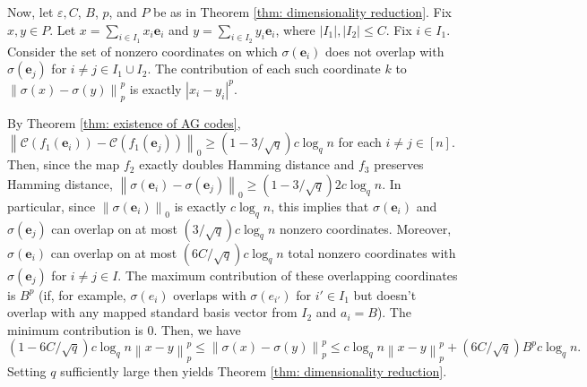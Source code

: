 \documentclass{theoretics}
\newcommand{\1}{\textbf{1}}
\newcommand{\norm}[1]{\left\lVert#1\right\rVert}
\newcommand{\e}{\mathbf{e}}
\begin{document}
Now, let $\varepsilon, C$, $B$, $p$, and $P$ be as in Theorem \ref{thm: dimensionality reduction}. Fix $x, y \in P$. Let $x = \sum_{i \in I_1} x_i \e_i$ and  $y = \sum_{i \in I_2} y_i \e_i$, where $|I_1|, |I_2| \leq C$. Fix $i \in I_1$. Consider the set of nonzero coordinates on which $\sigma(\e_i)$ does not overlap with $\sigma(\e_j)$ for $i \neq j \in I_1 \cup I_2$. The contribution of each such coordinate $k$ to $\norm{\sigma(x) - \sigma(y)}_p^p$ is exactly $|x_i - y_i|^p$. 

By Theorem \ref{thm: existence of AG codes}, $\norm{\mathcal{C}(f_1(\e_i)) - \mathcal{C}(f_1(\e_j))}_0 \geq (1 - 3/\sqrt{q}) c \log_q n$ for each $i \neq j \in [n]$. Then, since the map $f_2$ exactly doubles Hamming distance and $f_3$ preserves Hamming distance, $\norm{\sigma(\e_i) - \sigma(\e_j)}_0 \geq (1 - 3/\sqrt{q}) 2c \log_q n$. In particular, since $\norm{\sigma(\e_i)}_0$ is exactly $c \log_q n$, this implies that $\sigma(\e_i)$ and $\sigma(\e_j)$ can overlap on at most $(3/\sqrt{q}) c\log_q n$ nonzero coordinates. Moreover, $\sigma(\e_i)$ can overlap on at most $(6C/\sqrt{q}) c\log_q n$ total nonzero coordinates with $\sigma(\e_j)$ for $i \neq j \in I$. The maximum contribution of these overlapping coordinates is $B^p$ (if, for example, $\sigma(e_i)$ overlaps with $\sigma(e_{i'})$ for $i' \in I_1$ but doesn't overlap with any mapped standard basis vector from $I_2$ and $a_i = B$). The minimum contribution is $0$. Then, we have 
\[
(1 - 6C/\sqrt{q}) c\log_q n \norm{ x - y}_p^p \leq \norm{\sigma(x) - \sigma(y)}_p^p \leq c\log_q n \norm{ x - y}_p^p + (6C/\sqrt{q})B^p c \log_q n.
\]
Setting $q$ sufficiently large then yields Theorem \ref{thm: dimensionality reduction}.
\end{document}

